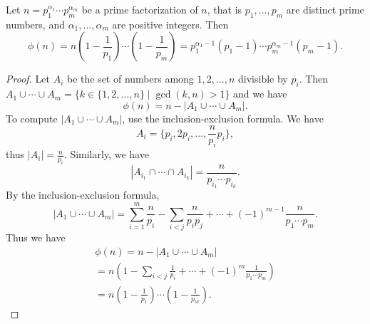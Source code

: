 \begin{page}

\begin{thm}
Let $n = p_1^{\alpha_1} \cdots p_m^{\alpha_m}$ be a prime factorization of $n$, that is
$p_1, \ldots, p_m$ are distinct prime numbers, and $\alpha_1, \ldots, \alpha_m$ are positive integers.
Then
\[
\phi(n) = n\left(1-\frac{1}{p_1}\right) \cdots \left(1-\frac{1}{p_m}\right)
= p_1^{\alpha_1-1}(p_1-1) \cdots p_m^{\alpha_m-1}(p_m-1).
\]
\end{thm}

\end{page}

\begin{page}

\begin{proof}
Let $A_i$ be the set of numbers among $1, 2, \ldots, n$ divisible by $p_i$.
Then $A_1 \cup \cdots \cup A_m = \{k \in \{1, 2, \ldots, n\} \mid \gcd(k,n) > 1\}$ and we have
\[
\phi(n) = n - |A_1 \cup \cdots \cup A_m|.
\]
To compute $|A_1 \cup \cdots \cup A_m|$, use the inclusion-exclusion formula.
We have
\[
A_i = \{p_i, 2p_i, \ldots, \frac{n}{p_i} p_i\},
\]
thus $|A_i| = \frac{n}{p_i}$.
Similarly, we have
\[
|A_{i_1} \cap \cdots \cap A_{i_k}| = \frac{n}{p_{i_1} \cdots p_{i_k}}.
\]
By the inclusion-exclusion formula,
\[
|A_1 \cup \cdots \cup A_m| = \sum_{i=1}^m \frac{n}{p_i} - \sum_{i<j} \frac{n}{p_ip_j} + \cdots + (-1)^{m-1} \frac{n}{p_1\cdots p_m}.
\]
Thus we have
\begin{multline*}
\phi(n) = n - |A_1 \cup \cdots \cup A_m|\\
= n \left( 1 - \sum_{i<j} \frac{1}{p_i} + \cdots + (-1)^m \frac{1}{p_1 \cdots p_m} \right)\\
= n \left(1-\frac{1}{p_1}\right) \cdots \left(1-\frac{1}{p_m}\right).
\end{multline*}


\end{proof}





\end{page}

